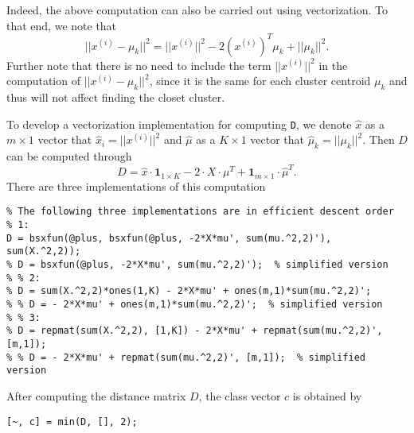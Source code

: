 \documentclass{article}
\begin{document}
Indeed, the above computation can also be carried out using vectorization. To that end, we note that
\[
||x^{(i)}-\mu_{k}||^2 = ||x^{(i)}||^2 -2(x^{(i)})^T\mu_{k} + ||\mu_{k}||^2.
\]
Further note that there is no need to include the term $||x^{(i)}||^2$ in the computation of $||x^{(i)}-\mu_{k}||^2$, since it is the same for each cluster centroid $\mu_{k}$ and thus will not affect finding the closet cluster.

To develop a vectorization implementation for computing \texttt{D}, we denote $\hat{x}$ as a $m\times 1$ vector that $\hat{x}_i=||x^{(i)}||^2$ and $\hat{\mu}$ as a $K\times 1$ vector that $\hat{\mu}_k=||\mu_{k}||^2$. Then $D$ can be computed through
\[
D=\hat{x}\cdot\bm{1}_{1\times K} - 2\cdot X \cdot \mu^T + \bm{1}_{m\times 1}\cdot \hat{\mu}^T.
\]
There are three implementations of this computation
\begin{verbatim}
% The following three implementations are in efficient descent order
% 1:
D = bsxfun(@plus, bsxfun(@plus, -2*X*mu', sum(mu.^2,2)'), sum(X.^2,2));
% D = bsxfun(@plus, -2*X*mu', sum(mu.^2,2)');  % simplified version
% % 2:
% D = sum(X.^2,2)*ones(1,K) - 2*X*mu' + ones(m,1)*sum(mu.^2,2)';
% % D = - 2*X*mu' + ones(m,1)*sum(mu.^2,2)';  % simplified version
% % 3:
% D = repmat(sum(X.^2,2), [1,K]) - 2*X*mu' + repmat(sum(mu.^2,2)', [m,1]);
% % D = - 2*X*mu' + repmat(sum(mu.^2,2)', [m,1]);  % simplified version
\end{verbatim}

After computing the distance matrix $D$, the class vector $c$ is obtained by
\begin{verbatim}
[~, c] = min(D, [], 2);
\end{verbatim}
\end{document}
